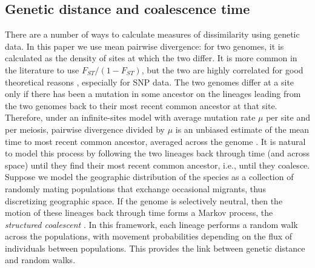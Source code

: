\documentclass{article}
\begin{document}
\subsection*{Genetic distance and coalescence time}

There are a number of ways to calculate measures of dissimilarity using genetic data.
In this paper we use mean pairwise divergence:
for two genomes, it is calculated as the density of sites at which the two differ.
It is more common in the literature to use $F_{ST}/(1-F_{ST})$,
but the two are highly correlated for good theoretical reasons 
\citep{slatkin1991inbreeding,rousset1997genetic},
especially for SNP data.
The two genomes differ at a site only if there has been a mutation in some ancestor on the lineages leading
from the two genomes back to their most recent common ancestor at that site.
Therefore,
under an infinite-sites model with average mutation rate $\mu$ per site and per meiosis,
pairwise divergence divided by $\mu$
is an unbiased estimate of the mean time to most recent common ancestor,
averaged across the genome \citep{hudson2007variance,ralph2015empirical}.
It is natural to model this process by following the two lineages back through time
(and across space)
until they find their most recent common ancestor,
i.e., until they coalesce.
Suppose we model the geographic distribution of the species
as a collection of randomly mating populations
that exchange occasional migrants,
thus discretizing geographic space.
If the genome is selectively neutral,
then the motion of these lineages back through time
forms a Markov process, the \emph{structured coalescent} \citep{wakeley2005coalescent}.
In this framework, each lineage performs a random walk across the populations,
with movement probabilities depending on the flux of individuals between populations.
This provides the link between genetic distance and random walks.
\end{document}

